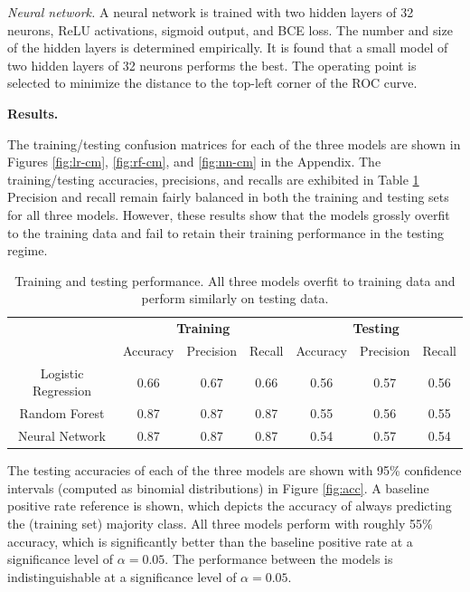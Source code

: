 \documentclass[12pt]{article}
\begin{document}
\textit{Neural network.} A neural network is trained with two hidden layers of 32 neurons, ReLU activations, sigmoid output, and BCE loss. The number and size of the hidden layers is determined empirically. It is found that a small model of two hidden layers of 32 neurons performs the best. The operating point is selected to minimize the distance to the top-left corner of the ROC curve.

\textbf{Results.}

The training/testing confusion matrices for each of the three models are shown in Figures \ref{fig:lr-cm}, \ref{fig:rf-cm}, and \ref{fig:nn-cm} in the Appendix. The training/testing accuracies, precisions, and recalls are exhibited in Table \ref{tab:performance} Precision and recall remain fairly balanced in both the training and testing sets for all three models. However, these results show that the models grossly overfit to the training data and fail to retain their training performance in the testing regime.

\begin{table}[h!]
\centering
\begin{tabular}{c|ccc|ccc}
    & \multicolumn{3}{c|}{\textbf{Training}} & \multicolumn{3}{c}{\textbf{Testing}} \\ 
    & Accuracy & Precision & Recall & Accuracy & Precision & Recall \\ 
    \hline
    Logistic Regression & 0.66 & 0.67 & 0.66 & 0.56 & 0.57 & 0.56 \\ 
    Random Forest & 0.87 & 0.87 & 0.87 & 0.55 & 0.56 & 0.55 \\ 
    Neural Network & 0.87 & 0.87 & 0.87 & 0.54 & 0.57 & 0.54 \\ 
\end{tabular}
\caption{Training and testing performance. All three models overfit to training data and perform similarly on testing data.}
\label{tab:performance}
\end{table}

The testing accuracies of each of the three models are shown with 95\% confidence intervals (computed as binomial distributions) in Figure \ref{fig:acc}. A baseline positive rate reference is shown, which depicts the accuracy of always predicting the (training set) majority class. All three models perform with roughly 55\% accuracy, which is significantly better than the baseline positive rate at a significance level of $\alpha = 0.05$. The performance between the models is indistinguishable at a significance level of $\alpha = 0.05$.
\end{document}
